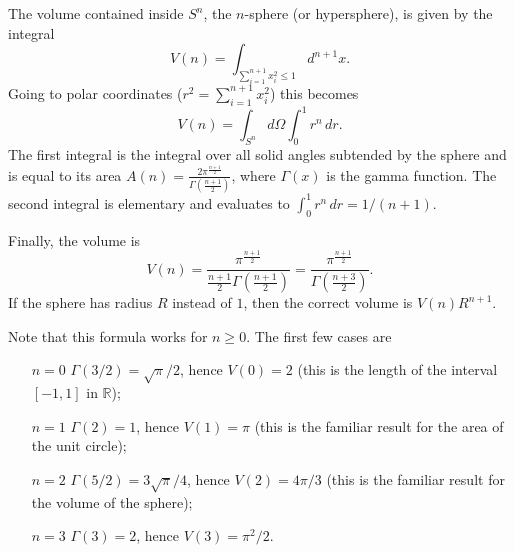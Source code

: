 \documentclass[12pt]{article}
\def\R{\mathbb{R}}
\begin{document}
The volume contained inside $S^n$, the $n$-sphere (or hypersphere), is
given by the integral
\[
  V(n) = \int_{\sum_{i=1}^{n+1}x_i^2\le1} d^{n+1} x.
\]
Going to polar coordinates ($r^2=\sum_{i=1}^{n+1}x_i^2$) this becomes
\[
  V(n) = \int_{S^n} d\Omega \int_0^1 r^{n}\, dr.
\]
The first integral is the integral over all solid angles subtended by the
sphere and is equal to its area
$A(n)=\frac{2\pi^{\frac{n+1}{2}}}{\Gamma\left(\frac{n+1}{2}\right)}$,
where $\Gamma(x)$ is the gamma function.
The second integral is elementary and evaluates to
$\int_0^1 r^{n}\, dr = 1/(n+1)$.

Finally, the volume is
\[
  V(n) = \frac{\pi^{\frac{n+1}{2}}}{\frac{n+1}{2}\Gamma\left(\frac{n+1}{2}\right)}
    = \frac{\pi^{\frac{n+1}{2}}}{\Gamma\left(\frac{n+3}{2}\right)}.
\]
If the sphere has radius $R$ instead of $1$, then the correct volume is
$V(n)R^{n+1}$.

Note that this formula works for $n\ge0$. The first few cases are
\begin{itemize}
  \item[$n=0$] $\Gamma(3/2)=\sqrt{\pi}/2$, hence $V(0)=2$ (this is the
    length of the interval $[-1,1]$ in $\R$);
  \item[$n=1$] $\Gamma(2)=1$, hence $V(1) = \pi$ (this is the familiar
    result for the area of the unit circle);
  \item[$n=2$] $\Gamma(5/2)=3\sqrt{\pi}/4$, hence $V(2) = 4\pi/3$
    (this is the familiar result for the volume of the  sphere);
  \item[$n=3$] $\Gamma(3)=2$, hence $V(3) = \pi^2/2$.
\end{itemize}
\end{document}
